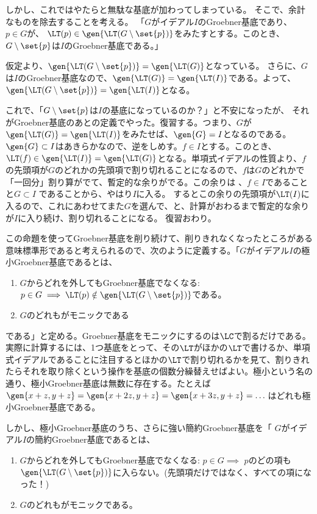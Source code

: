 しかし、これではやたらと無駄な基底が加わってしまっている。
そこで、余計なものを除去することを考える。
「$G$がイデアル$I$のGroebner基底であり、$p\in G$が、
$\LT(p) \in \gen{\LT(G\setminus \set{p})}$をみたすとする。このとき、
$G\setminus\set{p}$は$I$のGroebner基底である。」
\begin{myproof}
 仮定より、$\gen{\LT(G\setminus \set{p})} = \gen{\LT(G)}$となっている。
 さらに、$G$は$I$のGroebner基底なので、$\gen{\LT(G)} = \gen{\LT(I)}$である。よって、
 $\gen{\LT(G\setminus \set{p})} = \gen{\LT(I)}$となる。
\end{myproof}
これで、「$G\setminus \set{p}$は$I$の基底になっているのか？」と不安になったが、
それがGroebner基底のあとの定義でやった。復習する。つまり、$G$が$\gen{\LT(G)} = \gen{\LT(I)}$をみたせば、$\gen{G} = I$となるのである。$\gen{G}\subset I$はあきらかなので、逆をしめす。$f\in I$とする。このとき、$\LT(f) \in \gen{\LT(I)} = \gen{\LT(G)}$となる。単項式イデアルの性質より、$f$の先頭項が$G$のどれかの先頭項で割り切れることになるので、$f$は$G$のどれかで「一回分」割り算がでて、暫定的な余りがでる。この余りは
、$f\in I$であることと$G\subset I$ であることから、やはり$I$に入る。
するとこの余りの先頭項が$\LT(I)$に入るので、これにあわせてまた$G$を選んで、と、計算がおわるまで暫定的な余りが$I$に入り続け、割り切れることになる。
復習おわり。

この命題を使ってGroebner基底を削り続けて、削りきれなくなったところがある意味標準形であると考えられるので、次のように定義する。「$G$がイデアル$I$の極小Groebner基底であるとは、
\begin{enumerate}[label=(\arabic*)]
  \item $G$からどれを外してもGroebner基底でなくなる: $p \in G \implies \LT(p) \notin \gen{\LT(G\setminus \set{p})}$である。
  \item $G$のどれもがモニックである
\end{enumerate}
である」と定める。Groebner基底をモニックにするのは$\LC$で割るだけである。
実際に計算するには、1つ基底をとって、その$\LT$がほかの$\LT$で書けるか、単項式イデアルであることに注目するとほかの$\LT$で割り切れるかを見て、割りきれたらそれを取り除くという操作を基底の個数分繰替えせばよい。極小という名の通り、極小Groebner基底は無数に存在する。たとえば$\gen{x+z,y+z} = \gen{x+2z,y+z} = \gen{x+3z,y+z}=\dots$はどれも極小Groebner基底である。

しかし、極小Groebner基底のうち、さらに強い簡約Groebner基底を「
$G$がイデアル$I$の簡約Groebner基底であるとは、
\begin{enumerate}[label=(\arabic*)]
  \item $G$からどれを外してもGroebner基底でなくなる: $p \in G \implies $ $p$のどの項も$\gen{\LT(G\setminus \set{p})}$に入らない。(先頭項だけではなく、すべての項になった！)
  \item $G$のどれもがモニックである。
\end{enumerate}

